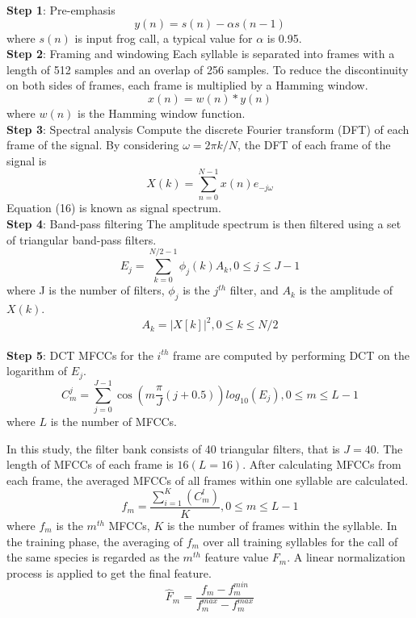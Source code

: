 \noindent  \textbf{Step 1}: Pre-emphasis
\begin{equation}
y(n)=s(n)-\alpha s(n-1)
\end{equation}
where $s(n)$ is input frog call, a typical value for $\alpha$ is 0.95.
\\[6pt]
\noindent  \textbf{Step 2}: Framing and windowing
Each syllable is separated into frames with a length of 512 samples and an overlap of 256 samples. To reduce the discontinuity on both sides of frames, each frame is multiplied by a Hamming window.
\begin{equation}
x(n)=w(n)*y(n)
\end{equation}
where $w(n)$ is the Hamming window function.
\\[6pt]
\noindent  \textbf{Step 3}: Spectral analysis
Compute the discrete Fourier transform (DFT) of each frame of the signal. By considering 
$\omega =2\pi k/N$, the DFT of each frame of the signal is 
\begin{equation}
X(k)=\sum_{n=0}^{N-1}x(n)e_{-j\omega}
\end{equation}
Equation (16) is known as signal spectrum.
\\[6pt]
\noindent  \textbf{Step 4}: Band-pass filtering
The amplitude spectrum is then filtered using a set of triangular band-pass filters.
\begin{equation}
E_{j}=\sum_{k=0}^{N/2-1}\phi_{j}(k)A_{k}, 0 \leq j \leq J-1
\end{equation}
where J is the number of filters, $\phi_{j}$ is the $j^{th}$ filter, and $A_{k}$ is the amplitude of $X(k)$.
\begin{equation}
A_{k}=|X[k]|^{2}, 0 \leq k \leq N/2
\end{equation}
\\[6pt]
\noindent  \textbf{Step 5}: DCT
MFCCs for the $i^{th}$ frame are computed by performing DCT on the logarithm of $E_{j}$. 
\begin{equation}
C_{m}^{j} = \sum_{j=0}^{J-1}\cos(m \frac{\pi}{J}(j+0.5))log_{10}(E_{j}), 0 \leq m \leq L-1
\end{equation}
where $L$ is the number of MFCCs.

In this study, the filter bank consists of 40 triangular filters, that is  $J=40$. The length of MFCCs of each frame is $16 (L=16)$. After calculating MFCCs from each frame, the averaged MFCCs of all frames within one syllable are calculated.
\begin{equation}
f_{m}= \frac{\sum_{i=1}^{K}(C_{m}^{l})}{K}, 0\leq m \leq L-1
\end{equation}
where $f_{m}$ is the $m^{th}$ MFCCs, $K$ is the number of frames within the syllable. In the training phase, the averaging of $ f_{m}$ over all training syllables for the call of the same species is regarded as the $m^{th}$ feature value $F_{m} $. A linear normalization process is applied to get the final feature.
\begin{equation}
\hat{F}_{m}=\frac{f_{m}-f_{m}^{min}}{f_{m}^{max}-f_{m}^{max}}
\end{equation}



